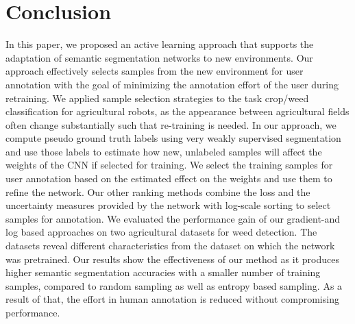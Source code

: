 \documentclass[letterpaper, 10 pt, conference]{ieeeconf}  %
\begin{document}
\section{Conclusion}
\label{sec:conclusion}

In this paper, we proposed an active learning approach that supports the adaptation
of semantic segmentation networks to  new environments. Our approach  effectively 
selects samples from the new environment for user annotation with the goal of 
minimizing the annotation effort of the user during retraining.
We applied  sample selection strategies to the task crop/weed classification for agricultural robots,
as the appearance between agricultural fields often change substantially such that
re-training is needed. 
In our approach, we compute pseudo ground truth labels using very weakly supervised 
segmentation and use those labels to estimate how new, unlabeled samples will 
affect the weights of the CNN if selected for training. We select the training
samples for user annotation based on the estimated effect on the weights and use them to refine the 
network. Our other ranking methods combine the loss and the uncertainty measures provided by the network with 
log-scale sorting to select samples for annotation.
We evaluated  the performance gain of our gradient-and log based 
approaches on two agricultural  datasets for weed detection. The datasets 
reveal different characteristics from the dataset on which the network was pretrained.
Our results show the effectiveness of our method as it produces higher semantic segmentation
accuracies with a smaller number of training samples, compared to random sampling as
well as entropy based sampling. As a result
of that, the effort in human annotation is reduced without compromising
performance.
 
\clearpage



\end{document}
